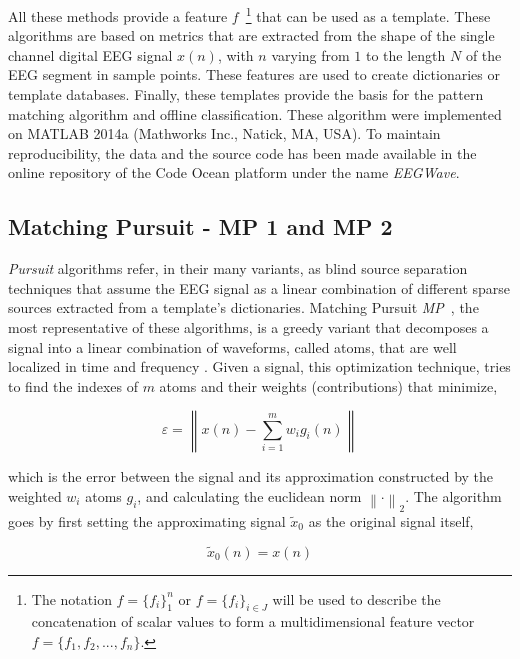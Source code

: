 \documentclass[brainsci,article,submit,moreauthors,pdftex,10pt,a4paper]{mdpi}
\begin{document}
All these methods provide a feature $ f $~\footnote{The notation $f=\{f_i\}_{1}^{n} $ or $f=\{f_i\}_{i \in J}^{} $  will be used to describe the concatenation of scalar values to form a multidimensional feature vector $f=\{f_1,f_2,...,f_n\}$.}  that can be used as a template. These algorithms are based on metrics that are extracted from the shape of the single channel digital EEG signal $x(n)$, with $n$ varying from $1$ to the length $N$ of the EEG segment in sample points.  These features are used to create dictionaries or template databases.  Finally, these templates provide the basis for the pattern matching algorithm and offline classification. These algorithm were implemented on MATLAB 2014a (Mathworks Inc., Natick, MA, USA).  To maintain reproducibility, the data and the source code has been made available in the online repository of the Code Ocean platform under the name \textit{EEGWave}.

\subsection{Matching Pursuit - MP 1 and MP 2}

\textit{Pursuit} algorithms refer, in their many variants, as blind source separation \citep{Vincent2010} techniques that assume the EEG signal as a linear combination of different sparse sources extracted from a template's dictionaries.  Matching Pursuit \textit{MP}~\citep{Mallat1993}, the most representative of these algorithms, is a greedy variant that decomposes a signal into a linear combination of waveforms, called atoms, that are well localized in time and frequency \citep{ChandranKS2016}.  Given a signal, this optimization technique, tries to find the indexes of $m$ atoms and their weights (contributions) that minimize,


\begin{equation}
\varepsilon =  \left\lVert   x(n) - \sum_{i=1}^{m} w_i g_{i}(n)   \right\rVert
\label{eq:mperror}
\end{equation}

\noindent which is the error between the signal and its approximation constructed by the weighted $w_i$ atoms $g_{i}$, and calculating the euclidean norm ${\left\lVert \cdot \right\rVert}_{2}$.  The algorithm goes by first setting the approximating signal $\tilde{x}_{0}$  as the original signal itself,  

\begin{equation}
\tilde{x}_{0}(n) = x(n)
\label{eq:mp2}
\end{equation}
\end{document}
